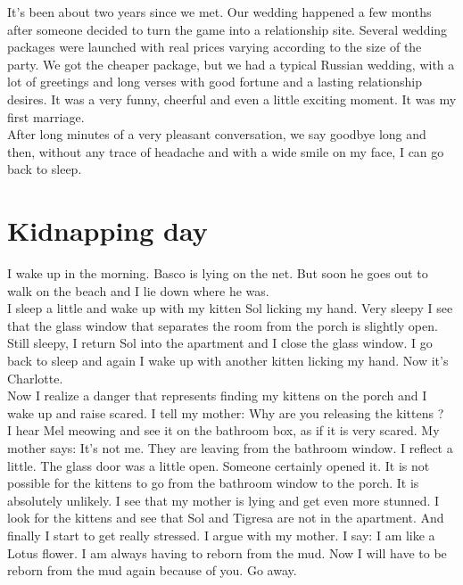 \documentclass[11pt]{book}
\begin{document}
\noindent It's been about two years since we met. Our wedding happened a few months after someone decided to turn the game into a relationship site. Several wedding packages were launched with real prices varying according to the size of the party. We got the cheaper package, but we had a typical Russian wedding, with a lot of greetings and long verses with good fortune and a lasting relationship desires. It was a very funny, cheerful and even a little exciting moment. It was my first marriage. \\

\noindent After long minutes of a very pleasant conversation, we say goodbye long and then, without any trace of headache and with a wide smile on my face, I can go back to sleep.

\chapter{Kidnapping day}

\noindent I wake up in the morning. Basco is lying on the net. But soon he goes out to walk on the beach and I lie down where he was. \\

\noindent I sleep a little and wake up with my kitten Sol licking my hand. Very sleepy I see that the glass window that separates the room from the porch is slightly open. Still sleepy, I return Sol into the apartment and I close the glass window. I go back to sleep and again I wake up with another kitten licking my hand. Now it's Charlotte. \\

\noindent Now I realize a danger that represents finding my kittens on the porch and I wake up and raise scared. I tell my mother: Why are you releasing the kittens ? \\

\noindent I hear Mel meowing and see it on the bathroom box, as if it is very scared. My mother says: It's not me. They are leaving from the bathroom window. I reflect a little. The glass door was a little open. Someone certainly opened it. It is not possible for the kittens to go from the bathroom window to the porch. It is absolutely unlikely. I see that my mother is lying and get even more stunned. I look for the kittens and see that Sol and Tigresa are not in the apartment. And finally I start to get really stressed. I argue with my mother. I say: I am like a Lotus flower. I am always having to reborn from the mud. Now I will have to be reborn from the mud again because of you. Go away. \\
\end{document}
